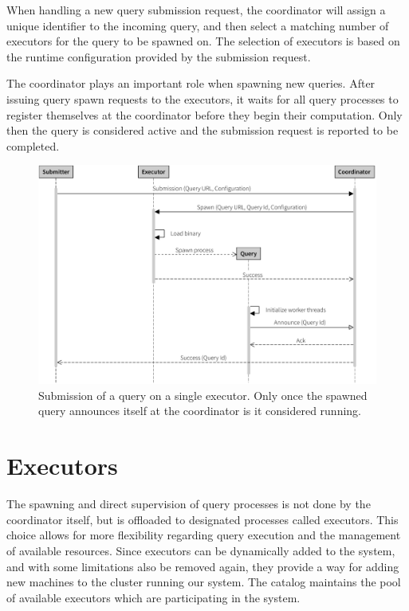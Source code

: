 When handling a new query submission request, the coordinator will assign a
unique identifier to the incoming query, and then select a
matching number of executors for the query to be spawned on. The selection
of executors is based on the runtime configuration provided by the submission
request.

The coordinator plays an important role when spawning new queries. After
issuing query spawn requests to the executors, it waits for all query processes
to register themselves at the coordinator before they begin their computation.
Only then the query is considered active and the submission request
is reported to be completed.

\begin{figure}[htb]
  \centering
    \includegraphics[width=1\textwidth]{figures/spawn_singleprocess}
  \caption[Query submission with single process.]{Submission of a query on a single executor.
  Only once the spawned query announces itself at the coordinator is it considered running.}
  \label{fig:subsingle}
\end{figure}

\section{Executors}

The spawning and direct supervision of query processes is not done by the
coordinator itself, but is offloaded to designated processes called executors.
This choice allows for more flexibility regarding query execution and the
management of available resources. Since executors can be dynamically added
to the system, and with some limitations also be removed again, they provide
a way for adding new machines to the cluster running our system. The catalog
maintains the pool of available executors which are participating in the system.

